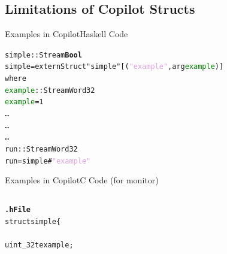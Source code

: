\documentclass[xcolor={dvipsnames}]{beamer}
\begin{document}
\subsection[Struct Limitations]{Limitations of Copilot Structs}
\begin{frame}{Examples in Copilot}{Haskell Code}
  \begin{alltt}
    \small{
    \setlength{\parindent}{-10pt}
    
    
    simple :: Stream \textbf{Bool} \\
    simple = \alert{externStruct} "simple" [(\textcolor{Plum}{"example"}, arg \textcolor{Green}{example})] \\
    \setlength{\parindent}{0pt}
    where \\
    \setlength{\parindent}{10pt}
    \textcolor{Green}{example} :: Stream Word32 \\
    \textcolor{Green}{example} = 1 \\
    \setlength{\parindent}{-15pt}
    \dots\\
    \dots\\
    \dots\\
    \setlength{\parindent}{-10pt}
    run :: Stream Word32 \\
    run = simple\#\textcolor{Plum}{"example"}
    }
  \end{alltt}
\end{frame}
\begin{frame}{Examples in Copilot}{C Code (for monitor)}
  \begin{alltt}
    \begin{columns}
      \begin{column}{0.5\textwidth}
        \scriptsize\par{\textbf{.h File}\\
        \textcolor{Emerald}{struct simple} \{ \\}
        \setlength{\parindent}{10pt}
        \textcolor{Peach}{uint\_32t example;}\\
        \noindent{\};}
      \end{column}
      \begin{column}{0.5\textwidth}
        \setlength{\parindent}{10pt}
        \scriptsize\par{}
      \end{column}
    \end{columns}

  \end{alltt}
\end{frame}
\end{document}
